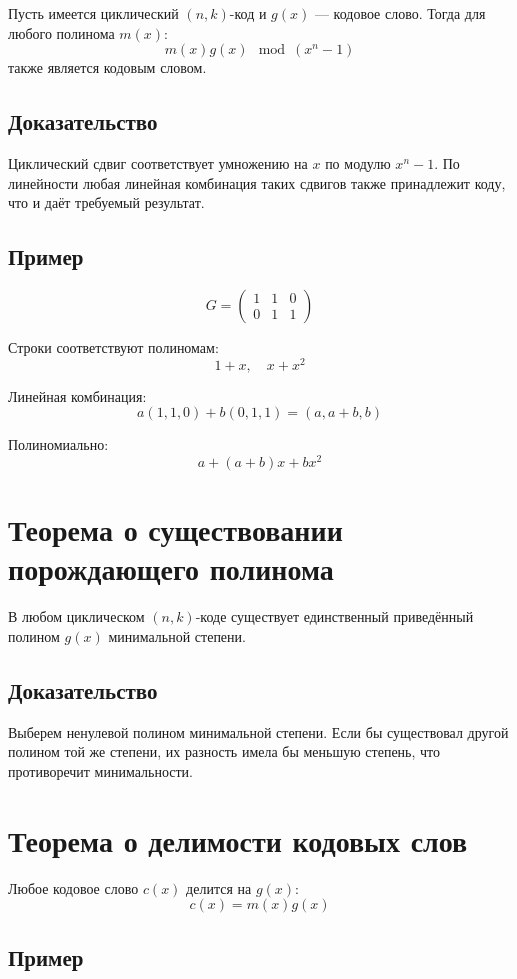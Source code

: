 \documentclass[a4paper,12pt]{article}
\begin{document}
Пусть имеется циклический $(n,k)$-код и $g(x)$ --- кодовое слово.
Тогда для любого полинома $m(x)$:
\[
m(x)g(x) \mod (x^n - 1)
\]
также является кодовым словом.

\subsection*{Доказательство}

Циклический сдвиг соответствует умножению на $x$ по модулю $x^n - 1$.
По линейности любая линейная комбинация таких сдвигов также принадлежит коду,
что и даёт требуемый результат.

\subsection*{Пример}

\[
G =
\begin{pmatrix}
1 & 1 & 0 \\
0 & 1 & 1
\end{pmatrix}
\]

Строки соответствуют полиномам:
\[
1 + x, \quad x + x^2
\]

Линейная комбинация:
\[
a(1,1,0) + b(0,1,1) = (a, a+b, b)
\]

Полиномиально:
\[
a + (a+b)x + bx^2
\]

\section{Теорема о существовании порождающего полинома}

В любом циклическом $(n,k)$-коде существует единственный приведённый
полином $g(x)$ минимальной степени.

\subsection*{Доказательство}

Выберем ненулевой полином минимальной степени. Если бы существовал
другой полином той же степени, их разность имела бы меньшую степень,
что противоречит минимальности.

\section{Теорема о делимости кодовых слов}

Любое кодовое слово $c(x)$ делится на $g(x)$:
\[
c(x) = m(x)g(x)
\]

\subsection*{Пример}
\end{document}
